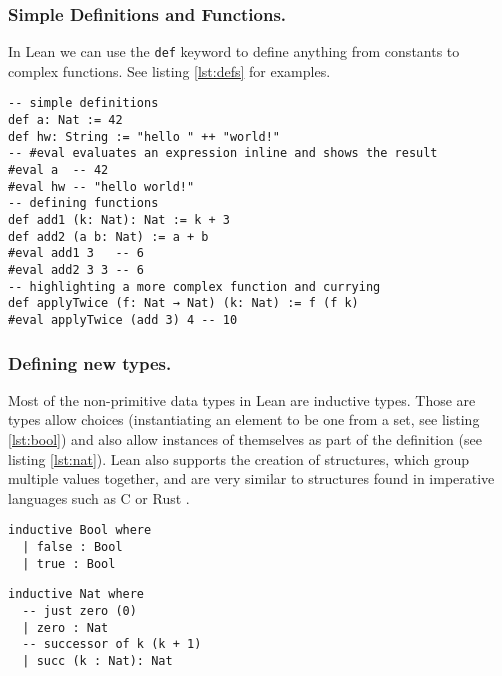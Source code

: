 \documentclass[runningheads]{llncs}
\begin{document}
\subsubsection{Simple Definitions and Functions.}

In Lean we can use the \lstinline{def} keyword to define anything from
constants to complex functions. See listing \ref{lst:defs} for examples.

\begin{lstlisting}[caption=Examples of simple definitions and function definitions in Lean,
    label=lst:defs]
-- simple definitions
def a: Nat := 42
def hw: String := "hello " ++ "world!"
-- #eval evaluates an expression inline and shows the result
#eval a  -- 42
#eval hw -- "hello world!"
-- defining functions 
def add1 (k: Nat): Nat := k + 3
def add2 (a b: Nat) := a + b
#eval add1 3   -- 6
#eval add2 3 3 -- 6
-- highlighting a more complex function and currying 
def applyTwice (f: Nat → Nat) (k: Nat) := f (f k)
#eval applyTwice (add 3) 4 -- 10
\end{lstlisting}

\subsubsection{Defining new types.}

Most of the non-primitive data types in Lean are inductive types. Those are
types allow choices (instantiating an element to be one from a set, see listing
\ref{lst:bool}) and also allow instances of themselves as part of the
definition (see listing \ref{lst:nat}). Lean also supports the creation of
structures, which group multiple values together, and are very similar to
structures found in imperative languages such as C or Rust
\cite{func_prog_in_lean}. 

\begin{multicols}{2}

\begin{lstlisting}[caption=The Bool type has two constructors without
    parameters: one for \lstinline{true} and one for \lstinline{false},
    label=lst:bool]
inductive Bool where
  | false : Bool
  | true : Bool
\end{lstlisting}

\columnbreak

\begin{lstlisting}[caption=Recursive definition of natural numbers,
    label=lst:nat]
inductive Nat where
  -- just zero (0)
  | zero : Nat
  -- successor of k (k + 1)
  | succ (k : Nat): Nat
\end{lstlisting}

\end{multicols}
\end{document}
